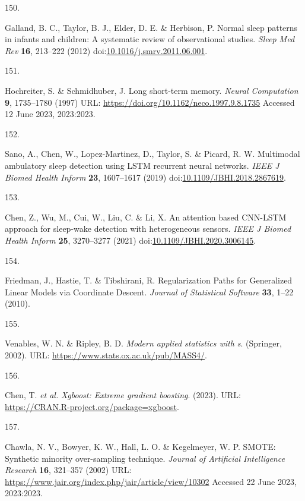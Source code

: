 \documentclass[
  10pt,
]{scrbook}
\newlength{\cslhangindent}
\newlength{\csllabelwidth}
\newlength{\cslentryspacingunit} %
\newenvironment{CSLReferences}[2] %
 {%
  \setlength{\parindent}{0pt}
  \ifodd #1
  \let\oldpar\par
  \def\par{\hangindent=\cslhangindent\oldpar}
  \fi
  \setlength{\parskip}{#2\cslentryspacingunit}
 }%
 {}
\newcommand{\CSLLeftMargin}[1]{\parbox[t]{\csllabelwidth}{#1}}
\newcommand{\CSLRightInline}[1]{\parbox[t]{\linewidth - \csllabelwidth}{#1}\break}
\let\originaltextbf\textbf
\renewcommand{\textbf}[1]{\textcolor{color1}{\originaltextbf{#1}}}
\begin{document}
\begin{CSLReferences}{0}{0}
\leavevmode{}%
\CSLLeftMargin{150. }%
\CSLRightInline{Galland, B. C., Taylor, B. J., Elder, D. E. \& Herbison,
P. Normal sleep patterns in infants and children: A systematic review of
observational studies. \emph{Sleep Med Rev} \textbf{16}, 213--222 (2012)
doi:\href{https://doi.org/10.1016/j.smrv.2011.06.001}{10.1016/j.smrv.2011.06.001}.}

\leavevmode{}%
\CSLLeftMargin{151. }%
\CSLRightInline{Hochreiter, S. \& Schmidhuber, J. Long short-term
memory. \emph{Neural Computation} \textbf{9}, 1735--1780 (1997) URL:
\url{https://doi.org/10.1162/neco.1997.9.8.1735} Accessed 12 June 2023,
2023:2023.}

\leavevmode{}%
\CSLLeftMargin{152. }%
\CSLRightInline{Sano, A., Chen, W., Lopez-Martinez, D., Taylor, S. \&
Picard, R. W. Multimodal ambulatory sleep detection using {LSTM}
recurrent neural networks. \emph{{IEEE} J Biomed Health Inform}
\textbf{23}, 1607--1617 (2019)
doi:\href{https://doi.org/10.1109/JBHI.2018.2867619}{10.1109/JBHI.2018.2867619}.}

\leavevmode{}%
\CSLLeftMargin{153. }%
\CSLRightInline{Chen, Z., Wu, M., Cui, W., Liu, C. \& Li, X. An
attention based {CNN}-{LSTM} approach for sleep-wake detection with
heterogeneous sensors. \emph{{IEEE} J Biomed Health Inform} \textbf{25},
3270--3277 (2021)
doi:\href{https://doi.org/10.1109/JBHI.2020.3006145}{10.1109/JBHI.2020.3006145}.}

\leavevmode{}%
\CSLLeftMargin{154. }%
\CSLRightInline{Friedman, J., Hastie, T. \& Tibshirani, R.
Regularization Paths for Generalized Linear Models via Coordinate
Descent. \emph{Journal of Statistical Software} \textbf{33}, 1--22
(2010).}

\leavevmode{}%
\CSLLeftMargin{155. }%
\CSLRightInline{Venables, W. N. \& Ripley, B. D. \emph{Modern applied
statistics with s}. (Springer, 2002). URL:
\url{https://www.stats.ox.ac.uk/pub/MASS4/}.}

\leavevmode{}%
\CSLLeftMargin{156. }%
\CSLRightInline{Chen, T. \emph{et al.} \emph{Xgboost: Extreme gradient
boosting}. (2023). URL:
\url{https://CRAN.R-project.org/package=xgboost}.}

\leavevmode{}%
\CSLLeftMargin{157. }%
\CSLRightInline{Chawla, N. V., Bowyer, K. W., Hall, L. O. \& Kegelmeyer,
W. P. {SMOTE}: Synthetic minority over-sampling technique. \emph{Journal
of Artificial Intelligence Research} \textbf{16}, 321--357 (2002) URL:
\url{https://www.jair.org/index.php/jair/article/view/10302} Accessed 22
June 2023, 2023:2023.}


\end{CSLReferences}
\end{document}
